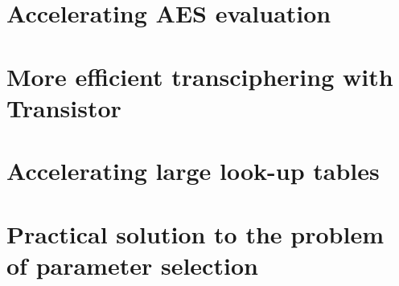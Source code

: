 \documentclass[11pt, twoside, openright]{thesis}
\begin{document}
\chapter{Accelerating AES evaluation}


\chapter{More efficient transciphering with Transistor}



\chapter{Accelerating large look-up tables}


\chapter{Practical solution to the problem of parameter selection}
%
%





\end{document}
